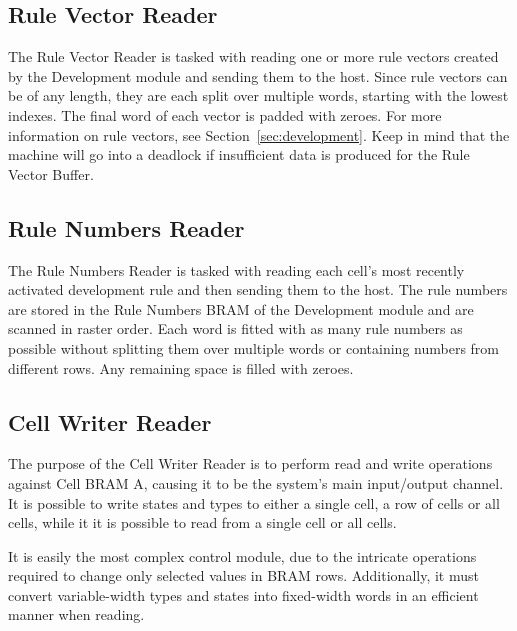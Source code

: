 \subsection{Rule Vector Reader}

The Rule Vector Reader is tasked with reading one or more rule vectors created by the Development module and sending them to the host.
Since rule vectors can be of any length, they are each split over multiple words, starting with the lowest indexes.
The final word of each vector is padded with zeroes.
For more information on rule vectors, see Section~\ref{sec:development}.
Keep in mind that the machine will go into a deadlock if insufficient data is produced for the Rule Vector Buffer.

\subsection{Rule Numbers Reader}
\label{sec:rule-numbers-reader}

The Rule Numbers Reader is tasked with reading each cell's most recently activated development rule and then sending them to the host.
The rule numbers are stored in the Rule Numbers BRAM of the Development module and are scanned in raster order\footnotemark.
Each word is fitted with as many rule numbers as possible without splitting them over multiple words or containing numbers from different rows.
Any remaining space is filled with zeroes.


\subsection{Cell Writer Reader}

The purpose of the Cell Writer Reader is to perform read and write operations against Cell BRAM A, causing it to be the system's main input/output channel.
It is possible to write states and types to either a single cell, a row of cells or all cells, while it it is possible to read from a single cell or all cells.

It is easily the most complex control module, due to the intricate operations required to change only selected values in BRAM rows.
Additionally, it must convert variable-width types and states into fixed-width words in an efficient manner when reading.

